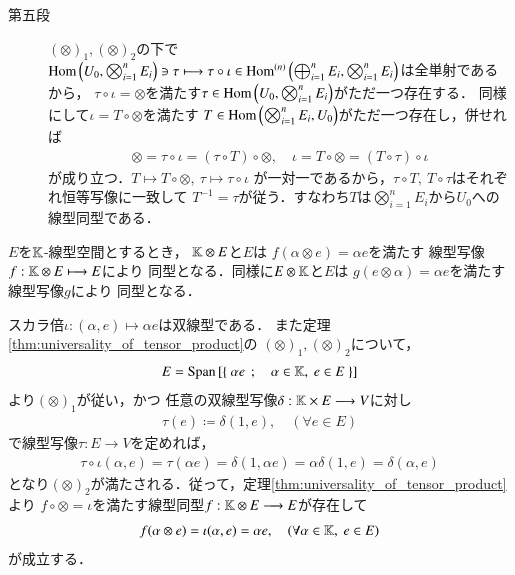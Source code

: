\begin{prf}
\begin{description}
			\item[第五段]
				$(\otimes)_1,(\otimes)_2$の下で
				$\Hom{U_0}{\bigotimes_{i=1}^n E_i} \ni \tau \longmapsto \tau \circ \iota \in \Ln{\bigoplus_{i=1}^n E_i}{\bigotimes_{i=1}^n E_i}{n}$は全単射であるから，
				$\tau \circ \iota = \otimes$を満たす$\tau \in \Hom{U_0}{\bigotimes_{i=1}^n E_i}$がただ一つ存在する．
				同様にして$\iota = T \circ \otimes$を満たす
				$T \in \Hom{\bigotimes_{i=1}^n E_i}{U_0}$がただ一つ存在し，併せれば
				\begin{align}
					\otimes = \tau \circ \iota = (\tau \circ T) \circ \otimes,
					\quad \iota = T \circ \otimes = (T \circ \tau) \circ \iota
				\end{align}
				が成り立つ．$T \longmapsto T \circ \otimes,\ \tau \longmapsto \tau \circ \iota$
				が一対一であるから，$\tau \circ T,\ T \circ \tau$はそれぞれ恒等写像に一致して
				$T^{-1} = \tau$が従う．すなわち$T$は$\bigotimes_{i=1}^n E_i$から$U_0$への
				線型同型である．
				\QED
		\end{description}
	\end{prf}
	
	\begin{screen}
		\begin{thm}[スカラーとのテンソル積]\label{thm:tensor_product_with_scalar}
			$E$を$\K$-線型空間とするとき，
			$\K \otimes E$と$E$は
			$f(\alpha \otimes e) = \alpha e$を満たす
			線型写像$f:\K \otimes E \longmapsto E$により
			同型となる．同様に$E \otimes \K$と$E$は
			$g(e \otimes \alpha) = \alpha e$を満たす
			線型写像$g$により
			同型となる．
		\end{thm}
	\end{screen}
	
	\begin{prf}
		スカラ倍$\iota:(\alpha, e) \longmapsto \alpha e$は双線型である．
		また定理\ref{thm:universality_of_tensor_product}の
		$(\otimes)_1,(\otimes)_2$について，
		\begin{align}
			E = \Span{\Set{\alpha e}{\alpha \in \K,\ e \in E}}
		\end{align}
		より$(\otimes)_1$が従い，かつ
		任意の双線型写像$\delta:\K \times E \longrightarrow V$に対し
		\begin{align}
			\tau(e) \coloneqq \delta(1,e),
			\quad (\forall e \in E)
		\end{align}
		で線型写像$\tau:E \longrightarrow V$を定めれば，
		\begin{align}
			\tau \circ \iota (\alpha,e) 
			= \tau(\alpha e) 
			= \delta(1,\alpha e)
			= \alpha \delta(1,e)
			= \delta (\alpha ,e)
		\end{align}
		となり$(\otimes)_2$が満たされる．従って，定理\ref{thm:universality_of_tensor_product}より
		$f \circ \otimes = \iota$を満たす線型同型$f:\K \otimes E \longrightarrow E$が存在して
		\begin{align}
			f(\alpha \otimes e) = \iota(\alpha,e) = \alpha e,
			\quad (\forall \alpha \in \K,\ e \in E)
		\end{align}
		が成立する．
		\QED
	\end{prf}
	
